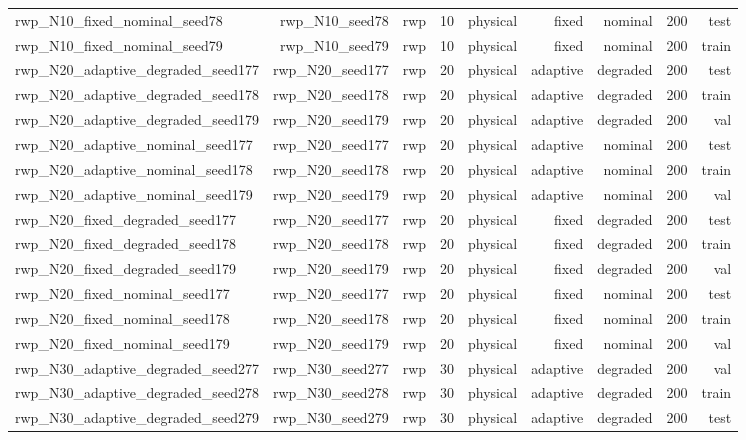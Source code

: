 \begin{tabular}{lrrrrrrrr}
rwp\_N10\_fixed\_nominal\_seed78 & rwp\_N10\_seed78 & rwp & 10 & physical & fixed & nominal & 200 & test \\
rwp\_N10\_fixed\_nominal\_seed79 & rwp\_N10\_seed79 & rwp & 10 & physical & fixed & nominal & 200 & train \\
rwp\_N20\_adaptive\_degraded\_seed177 & rwp\_N20\_seed177 & rwp & 20 & physical & adaptive & degraded & 200 & test \\
rwp\_N20\_adaptive\_degraded\_seed178 & rwp\_N20\_seed178 & rwp & 20 & physical & adaptive & degraded & 200 & train \\
rwp\_N20\_adaptive\_degraded\_seed179 & rwp\_N20\_seed179 & rwp & 20 & physical & adaptive & degraded & 200 & val \\
rwp\_N20\_adaptive\_nominal\_seed177 & rwp\_N20\_seed177 & rwp & 20 & physical & adaptive & nominal & 200 & test \\
rwp\_N20\_adaptive\_nominal\_seed178 & rwp\_N20\_seed178 & rwp & 20 & physical & adaptive & nominal & 200 & train \\
rwp\_N20\_adaptive\_nominal\_seed179 & rwp\_N20\_seed179 & rwp & 20 & physical & adaptive & nominal & 200 & val \\
rwp\_N20\_fixed\_degraded\_seed177 & rwp\_N20\_seed177 & rwp & 20 & physical & fixed & degraded & 200 & test \\
rwp\_N20\_fixed\_degraded\_seed178 & rwp\_N20\_seed178 & rwp & 20 & physical & fixed & degraded & 200 & train \\
rwp\_N20\_fixed\_degraded\_seed179 & rwp\_N20\_seed179 & rwp & 20 & physical & fixed & degraded & 200 & val \\
rwp\_N20\_fixed\_nominal\_seed177 & rwp\_N20\_seed177 & rwp & 20 & physical & fixed & nominal & 200 & test \\
rwp\_N20\_fixed\_nominal\_seed178 & rwp\_N20\_seed178 & rwp & 20 & physical & fixed & nominal & 200 & train \\
rwp\_N20\_fixed\_nominal\_seed179 & rwp\_N20\_seed179 & rwp & 20 & physical & fixed & nominal & 200 & val \\
rwp\_N30\_adaptive\_degraded\_seed277 & rwp\_N30\_seed277 & rwp & 30 & physical & adaptive & degraded & 200 & val \\
rwp\_N30\_adaptive\_degraded\_seed278 & rwp\_N30\_seed278 & rwp & 30 & physical & adaptive & degraded & 200 & train \\
rwp\_N30\_adaptive\_degraded\_seed279 & rwp\_N30\_seed279 & rwp & 30 & physical & adaptive & degraded & 200 & test \\

\end{tabular}

